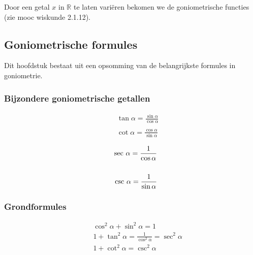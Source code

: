 Door een getal $x$ in $\mathbb{R}$ te laten variëren bekomen we de goniometrische functies (zie mooc wiskunde 2.1.12).

\subsection{Goniometrische formules}

Dit hoofdstuk bestaat uit een opsomming van de belangrijkste formules in goniometrie.

\subsubsection{Bijzondere goniometrische getallen}

\begin{minipage}[b]{0.5\linewidth}
\begin{eqnarray*}
&&\tan \alpha = \frac{\sin \alpha}{\cos \alpha}\\
&&\\
&&\cot \alpha = \frac{\cos \alpha}{\sin \alpha}
\end{eqnarray*}
\end{minipage}
\hspace{0.5cm}
\begin{minipage}[b]{0.5\linewidth}
\begin{eqnarray*}
&&\textup{sec }\alpha = \frac{1}{\cos \alpha}\\
&&\\
&&\textup{csc }\alpha = \frac{1}{\sin \alpha}
\end{eqnarray*}
\end{minipage}

\subsubsection{Grondformules}

\begin{minipage}[b]{0.5\linewidth}
\begin{eqnarray*}
&&\cos^2\alpha +\sin^2 \alpha =1\\
&&1+\tan^2\alpha= \frac{1}{\cos^2 \alpha} = \sec^2 \alpha\\
&&1+\cot^2\alpha = \csc^2 \alpha
\end{eqnarray*}
\end{minipage}

